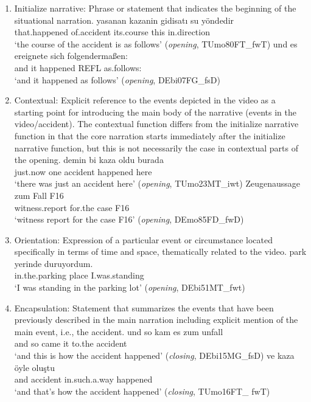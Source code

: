 \documentclass[output=paper,colorlinks,citecolor=brown]{langscibook}
\begin{document}
\begin{enumerate}[label=(\alph*)]
    \item Initialize narrative: Phrase or statement that indicates the beginning of the situational narration.  
    \ea \label{katsikaetal:nineteeninitialize}
\gll yasanan kazanin gidisatı su yöndedir\\
     that.happened of.accident its.course this in.direction\\
\glt `the course of the accident is as follows' (\textit{opening}, TUmo80FT\_fwT)
\ex \label{katsikaetal:twentyinitialize}
\gll und es ereignete sich folgendermaßen:\\
     and it happened  REFL     as.follows:\\
\glt `and it happened as follows' (\textit{opening}, DEbi07FG\_fsD)
\z

\item Contextual: Explicit reference to the events depicted in the video as a starting point for introducing the main body of the narrative (events in the video/accident). The contextual function differs from the initialize narrative function in that the core narration starts immediately after the initialize narrative function, but this is not necessarily the case in contextual parts of the opening.   
    \ea \label{katsikaetal:twentyonecontextual}
\gll demin     bi     kaza      oldu  burada\\
     just.now one accident happened  here\\
\glt `there was just an accident here' (\textit{opening}, TUmo23MT\_iwt)
\ex \label{katsikaetal:twentytwocontextual}
\gll Zeugenaussage  zum      Fall F16\\
     witness.report for.the   case F16\\
\glt `witness report for the case F16' (\textit{opening}, DEmo85FD\_fwD)
\z

\item Orientation: Expression of a particular event or circumstance located specifically in terms of time and space, thematically related to the video.  
    \ea \label{katsikaetal:twentythreeorientation}
\gll park yerinde duruyordum.\\
     in.the.parking place   I.was.standing\\
\glt `I was standing in the parking lot' (\textit{opening}, DEbi51MT\_fwt)
\z

\item Encapsulation: Statement that summarizes the events that have been previously described in the main narration including explicit mention of the main event, i.e., the accident.  
    \ea \label{katsikaetal:twentyfourencapsulation}
\gll und so kam  es zum    unfall\\
     and so came it to.the accident\\
\glt `and this is how the accident happened' (\textit{closing}, DEbi15MG\_fsD)
\ex \label{katsikaetal:twentyfiveencapsulation}
\gll ve  kaza      öyle          oluştu\\
     and accident  in.such.a.way happened\\
\glt `and that's how the accident happened' (\textit{closing}, TUmo16FT\_ fwT)
\z


\end{enumerate}
\end{document}
